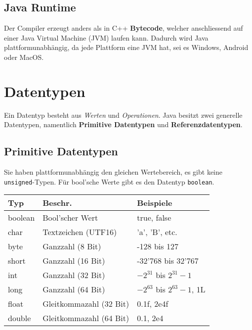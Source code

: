 \subsection{Java Runtime}
Der Compiler erzeugt anders als in C++ \textbf{Bytecode}, welcher anschliessend auf einer Java Virtual Machine (JVM) laufen kann.
Dadurch wird Java plattformunabhängig, da jede Plattform eine JVM hat, sei es Windows, Android oder MacOS.


\section{Datentypen}

Ein Datentyp besteht aus \textit{Werten} und \textit{Operationen}. Java besitzt zwei generelle Datentypen, 
namentlich \textbf{Primitive Datentypen} und \textbf{Referenzdatentypen}.

\subsection{Primitive Datentypen}
Sie haben plattformunabhängig den gleichen Wertebereich, es gibt keine \verb|unsigned|-Typen. Für bool'sche Werte gibt es den Datentyp \verb|boolean|.

\begin{center}
    \begin{tabular}{lll}
        \rowcolor[RGB]{239,239,239} 
        \textbf{Typ} & \textbf{Beschr.}        & \textbf{Beispiele} \\ \hline
        boolean      & Bool'scher Wert         & true, false \\
        char         & Textzeichen (UTF16)     & 'a', 'B', etc. \\
        byte         & Ganzzahl (8 Bit)        & -128 bis 127 \\
        short        & Ganzzahl (16 Bit)       & -32'768 bis 32'767 \\
        int          & Ganzzahl (32 Bit)       & $ -2^{31} $ bis $ 2^{31}-1 $ \\
        long         & Ganzzahl (64 Bit)       & $ -2^{63} $ bis $ 2^{63}-1 $, 1L \\
        float        & Gleitkommazahl (32 Bit) & 0.1f, 2e4f \\
        double       & Gleitkommazahl (64 Bit) & 0.1, 2e4 \\
    \end{tabular}
\end{center}

